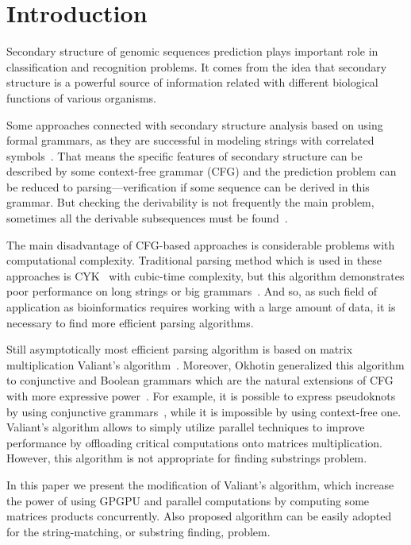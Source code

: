 \section{\bf Introduction}

Secondary structure of genomic sequences prediction plays important role in classification and recognition problems. It comes from the idea that secondary structure is a powerful source of information  related with different biological functions of various organisms.

Some approaches connected with secondary structure analysis based on using formal grammars, as they are successful in modeling strings with correlated symbols~\cite{knudsen1999rna, dowell2004evaluation}.
That means the specific features of secondary structure can be described by some context-free grammar (CFG) and the prediction problem can be reduced to parsing---verification if some sequence can be derived in this grammar.
But checking the derivability is not frequently the main problem, sometimes all the derivable subsequences must be found~\cite{durbin1996biological}.

The main disadvantage of CFG-based approaches is considerable problems with computational complexity.
Traditional parsing method which is used in these approaches is CYK~\cite{kasami1966efficient, Younger:1966:CLP:1441427.1442019} with cubic-time complexity, but this algorithm demonstrates poor performance on long strings or big grammars~\cite{liu2005parallel}.
And so, as such field of application as bioinformatics requires working with a large amount of data, it is necessary to find more efficient parsing algorithms.

Still asymptotically most efficient parsing algorithm is based on matrix multiplication Valiant's algorithm~\cite{Valiant:1975:GCR:1739932.1740048}.
Moreover, Okhotin generalized this algorithm to conjunctive and Boolean grammars which are the natural extensions of CFG with more expressive power~\cite{Okhotin:2014:PMM:2565359.2565379}.
For example, it is possible to express pseudoknots by using conjunctive grammars~\cite{zier2013rna}, while it is impossible by using context-free one.
Valiant’s algorithm allows to simply utilize parallel techniques to improve performance by offloading critical computations onto matrices multiplication.
However, this algorithm is not appropriate for finding substrings problem.

In this paper we present the modification of Valiant's algorithm, which increase the power of using GPGPU and parallel computations by computing some matrices products concurrently.
Also proposed algorithm can be easily adopted for the string-matching, or substring finding, problem.